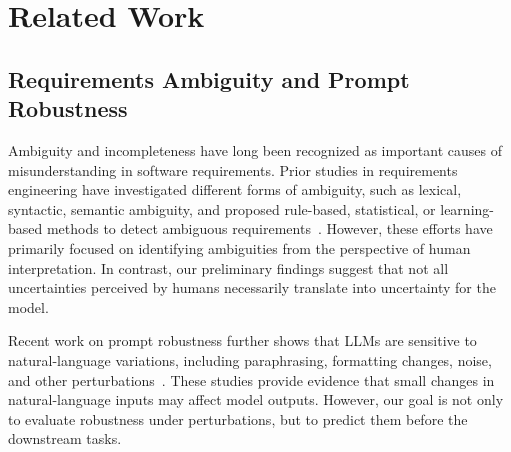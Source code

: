 \section{Related Work} \label{sec:relatedWork}

\subsection{Requirements Ambiguity and Prompt Robustness}

Ambiguity and incompleteness have long been recognized as important causes of misunderstanding in software requirements. Prior studies in requirements engineering have investigated different forms of ambiguity, such as lexical, syntactic, semantic ambiguity, and proposed rule-based, statistical, or learning-based methods to detect ambiguous requirements~\cite{berry2003ambiguity,ezzini2022anaphoric,abdeahad2026accurate}. However, these efforts have primarily focused on identifying ambiguities from the perspective of human interpretation. In contrast, our preliminary findings suggest that not all uncertainties perceived by humans necessarily translate into uncertainty for the model.%

Recent work on prompt robustness further shows that LLMs are sensitive to natural-language variations, including paraphrasing, formatting changes, noise, and other perturbations~\cite{morris2020textattack,zhu2024promptrobust,chen2026nlperturbator}. These studies provide evidence that small changes in natural-language inputs may affect model outputs. However, our goal is not only to evaluate robustness under perturbations, but to predict them before the downstream tasks. %


